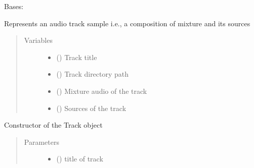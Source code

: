 \documentclass[letterpaper,10pt,english,openany,oneside]{sphinxmanual}
\begin{document}
\begin{fulllineitems}
\label{\detokenize{docs/source/preprocess:preprocess.track_classes.Track}}
Bases: 

Represents an audio track sample i.e., a composition of mixture and its sources
\begin{quote}\begin{description}
\item[{Variables}] \leavevmode\begin{itemize}
\item {} 
{\hyperref[\detokenize{docs/source/application.model:application.model.Track.title}]{}} () \textendash{} Track title

\item {} 
 () \textendash{} Track directory path

\item {} 
 ({\hyperref[\detokenize{docs/source/preprocess:preprocess.track_classes.Audio}]{}}) \textendash{} Mixture audio of the track

\item {} 
 (\sphinxstyleliteralemphasis{\sphinxupquote{{[}}}{\hyperref[\detokenize{docs/source/preprocess:preprocess.track_classes.Audio}]{\sphinxcrossref{\sphinxstyleliteralemphasis{\sphinxupquote{Audio}}}}}\sphinxstyleliteralemphasis{\sphinxupquote{{]}}}) \textendash{} Sources of the track

\end{itemize}

\end{description}\end{quote}

\begin{fulllineitems}
\label{\detokenize{docs/source/preprocess:preprocess.track_classes.Track.__init__}}
Constructor of the Track object
\begin{quote}\begin{description}
\item[{Parameters}] \leavevmode\begin{itemize}
\item {} 
 () \textendash{} title of track


\end{itemize}
\end{description}
\end{quote}
\end{fulllineitems}
\end{fulllineitems}
\end{document}
